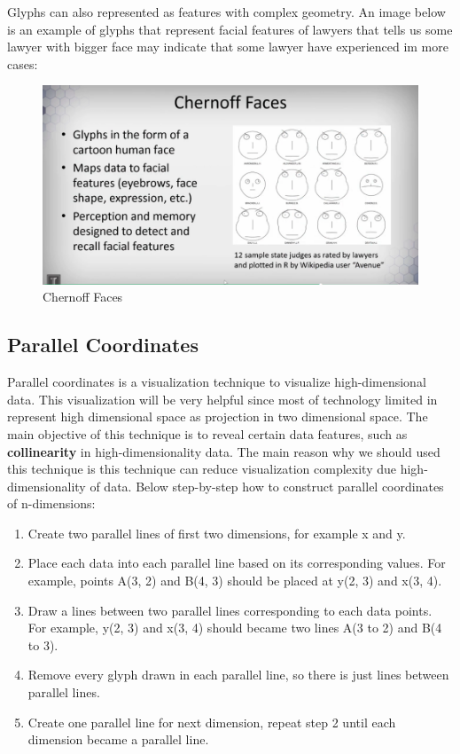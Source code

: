 \documentclass[11pt]{article}
\makeatletter
\def\maxwidth{\ifdim\Gin@nat@width>\linewidth\linewidth
    \else\Gin@nat@width\fi}
\let\Oldincludegraphics\includegraphics
\renewcommand{\includegraphics}[1]{\Oldincludegraphics[width=.8\maxwidth]{#1}}
\providecommand{\tightlist}{%
      \setlength{\itemsep}{0pt}\setlength{\parskip}{0pt}}
\makeatother
\begin{document}
Glyphs can also represented as features with complex geometry. An image
below is an example of glyphs that represent facial features of lawyers
that tells us some lawyer with bigger face may indicate that some lawyer
have experienced im more cases:

\begin{figure}
\centering
\includegraphics{images/chernoff-faces.png}
\caption{Chernoff Faces}
\end{figure}

    \subsection{Parallel Coordinates}\label{parallel-coordinates}

Parallel coordinates is a visualization technique to visualize
high-dimensional data. This visualization will be very helpful since
most of technology limited in represent high dimensional space as
projection in two dimensional space. The main objective of this
technique is to reveal certain data features, such as
\textbf{collinearity} in high-dimensionality data. The main reason why
we should used this technique is this technique can reduce visualization
complexity due high-dimensionality of data. Below step-by-step how to
construct parallel coordinates of n-dimensions:

\begin{enumerate}
\def\labelenumi{\arabic{enumi}.}
\tightlist
\item
  Create two parallel lines of first two dimensions, for example x and
  y.
\item
  Place each data into each parallel line based on its corresponding
  values. For example, points A(3, 2) and B(4, 3) should be placed at
  y(2, 3) and x(3, 4).
\item
  Draw a lines between two parallel lines corresponding to each data
  points. For example, y(2, 3) and x(3, 4) should became two lines A(3
  to 2) and B(4 to 3).
\item
  Remove every glyph drawn in each parallel line, so there is just lines
  between parallel lines.
\item
  Create one parallel line for next dimension, repeat step 2 until each
  dimension became a parallel line.
\end{enumerate}
\end{document}
